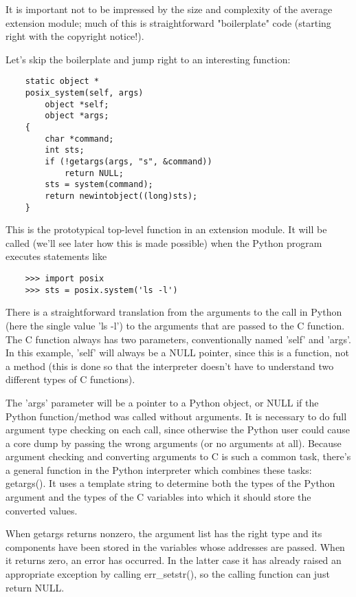 It is important not to be impressed by the size and complexity of
the average extension module; much of this is straightforward
"boilerplate" code (starting right with the copyright notice!).

Let's skip the boilerplate and jump right to an interesting function:

\begin{verbatim}
    static object *
    posix_system(self, args)
        object *self;
        object *args;
    {
        char *command;
        int sts;
        if (!getargs(args, "s", &command))
            return NULL;
        sts = system(command);
        return newintobject((long)sts);
    }
\end{verbatim}

This is the prototypical top-level function in an extension module.
It will be called (we'll see later how this is made possible) when the
Python program executes statements like

\begin{verbatim}
    >>> import posix
    >>> sts = posix.system('ls -l')
\end{verbatim}

There is a straightforward translation from the arguments to the call
in Python (here the single value 'ls -l') to the arguments that are
passed to the C function.  The C function always has two parameters,
conventionally named 'self' and 'args'.  In this example, 'self' will
always be a NULL pointer, since this is a function, not a method (this
is done so that the interpreter doesn't have to understand two
different types of C functions).

The 'args' parameter will be a pointer to a Python object, or NULL if
the Python function/method was called without arguments.  It is
necessary to do full argument type checking on each call, since
otherwise the Python user could cause a core dump by passing the wrong
arguments (or no arguments at all).  Because argument checking and
converting arguments to C is such a common task, there's a general
function in the Python interpreter which combines these tasks:
getargs().  It uses a template string to determine both the types of
the Python argument and the types of the C variables into which it
should store the converted values.

When getargs returns nonzero, the argument list has the right type and
its components have been stored in the variables whose addresses are
passed.  When it returns zero, an error has occurred.  In the latter
case it has already raised an appropriate exception by calling
err_setstr(), so the calling function can just return NULL.

